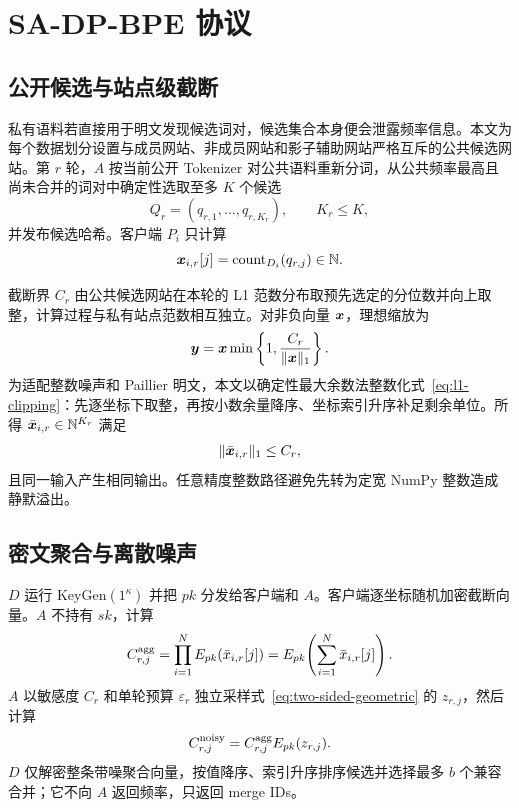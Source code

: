 \section{SA-DP-BPE 协议}

\subsection{公开候选与站点级截断}

私有语料若直接用于明文发现候选词对，候选集合本身便会泄露频率信息。本文为每个数据划分设置与成员网站、非成员网站和影子辅助网站严格互斥的公共候选网站。第 $r$ 轮，$A$ 按当前公开 Tokenizer 对公共语料重新分词，从公共频率最高且尚未合并的词对中确定性选取至多 $K$ 个候选
\begin{equation}
 Q_r=(q_{r,1},\ldots,q_{r,K_r}),\qquad K_r\leq K,
\end{equation}
并发布候选哈希。客户端 $P_i$ 只计算
\begin{equation}
 \bm{x}_{i,r}[j]=\operatorname{count}_{D_i}(q_{r,j})\in\mathbb N.
\end{equation}

截断界 $C_r$ 由公共候选网站在本轮的 L1 范数分布取预先选定的分位数并向上取整，计算过程与私有站点范数相互独立。对非负向量 $\bm{x}$，理想缩放为
\begin{equation}
 \bm{y}=\bm{x}\min\left\{1,\frac{C_r}{\|\bm{x}\|_1}\right\}.
 \label{eq:l1-clipping}
\end{equation}
为适配整数噪声和 Paillier 明文，本文以确定性最大余数法整数化式~\eqref{eq:l1-clipping}：先逐坐标下取整，再按小数余量降序、坐标索引升序补足剩余单位。所得 $\bar{\bm{x}}_{i,r}\in\mathbb N^{K_r}$ 满足
\begin{equation}
 \|\bar{\bm{x}}_{i,r}\|_1\leq C_r,
\end{equation}
且同一输入产生相同输出。任意精度整数路径避免先转为定宽 NumPy 整数造成静默溢出。

\subsection{密文聚合与离散噪声}

$D$ 运行 $\mathrm{KeyGen}(1^\kappa)$ 并把 $pk$ 分发给客户端和 $A$。客户端逐坐标随机加密截断向量。$A$ 不持有 $sk$，计算
\begin{equation}
 C^{\rm agg}_{r,j}=\prod_{i=1}^{N}E_{pk}(\bar{x}_{i,r}[j])
 =E_{pk}\!\left(\sum_{i=1}^{N}\bar{x}_{i,r}[j]\right).
 \label{eq:encrypted-aggregate}
\end{equation}
$A$ 以敏感度 $C_r$ 和单轮预算 $\varepsilon_r$ 独立采样式~\eqref{eq:two-sided-geometric} 的 $z_{r,j}$，然后计算
\begin{equation}
 C^{\rm noisy}_{r,j}=C^{\rm agg}_{r,j}E_{pk}(z_{r,j}).
 \label{eq:encrypted-noisy-aggregate}
\end{equation}
$D$ 仅解密整条带噪聚合向量，按值降序、索引升序排序候选并选择最多 $b$ 个兼容合并；它不向 $A$ 返回频率，只返回 merge IDs。

